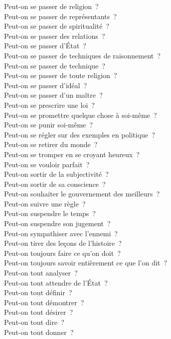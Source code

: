 \documentclass[a4paper,12pt]{article}
\begin{document}
Peut-on se passer de religion ? \\
Peut-on se passer de représentants ? \\
Peut-on se passer de spiritualité ? \\
Peut-on se passer des relations ? \\
Peut-on se passer d'État ? \\
Peut-on se passer de techniques de raisonnement ? \\
Peut-on se passer de technique ? \\
Peut-on se passer de toute religion ? \\
Peut-on se passer d'idéal ? \\
Peut-on se passer d'un maître ? \\
Peut-on se prescrire une loi ? \\
Peut-on se promettre quelque chose à soi-même ? \\
Peut-on se punir soi-même ? \\
Peut-on se régler sur des exemples en politique ? \\
Peut-on se retirer du monde ? \\
Peut-on se tromper en se croyant heureux ? \\
Peut-on se vouloir parfait ? \\
Peut-on sortir de la subjectivité ? \\
Peut-on sortir de sa conscience ? \\
Peut-on souhaiter le gouvernement des meilleurs ? \\
Peut-on suivre une règle ? \\
Peut-on suspendre le temps ? \\
Peut-on suspendre son jugement ? \\
Peut-on sympathiser avec l'ennemi ? \\
Peut-on tirer des leçons de l'histoire ? \\
Peut-on toujours faire ce qu'on doit ? \\
Peut-on toujours savoir entièrement ce que l'on dit ? \\
Peut-on tout analyser ? \\
Peut-on tout attendre de l'État ? \\
Peut-on tout définir ? \\
Peut-on tout démontrer ? \\
Peut-on tout désirer ? \\
Peut-on tout dire ? \\
Peut-on tout donner ? \\
\end{document}
